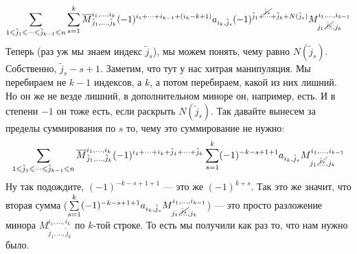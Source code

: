 \documentclass{article}
\begin{document}
\begin{itemize}
\begin{Proof}
            $$
            \sum\limits_{1\leqslant\tilde j_1\leqslant\cdots\leqslant\tilde j_{k-1}\leqslant n}\sum_{s=1}^k
            \overline M_{\tilde j_1,\ldots,\tilde j_k}^{i_1,\ldots,i_k}(-1)^{i_1+\cdots+i_{k-1}+(i_k-k+1)}a_{i_k,\tilde j_s}(-1)^{\tilde j_1+\overset{\cancel{\tilde j_s}}\cdots+\tilde j_k+N(\tilde j_s)}M_{j_1,\overset{\cancel{\tilde j_s}}\ldots,j_k}^{i_1,\ldots,i_{k-1}}
            $$
            Теперь (раз уж мы знаем индекс $\tilde j_s$), мы можем понять, чему равно $N(\tilde j_s)$. Собственно, $\tilde j_s-s+1$. Заметим, что тут у нас хитрая манипуляция. Мы перебираем не $k-1$ индексов, а $k$, а потом перебираем, какой из них лишний. Но он же не везде лишний, в дополнительном миноре он, например, есть. И в степени $-1$ он тоже есть, если раскрыть $N(\tilde j_s)$. Так давайте вынесем за пределы суммирования по $s$ то, чему это суммирование не нужно:
            $$
            \sum\limits_{1\leqslant\tilde j_1\leqslant\cdots\leqslant\tilde j_{k-1}\leqslant n}\overline M_{\tilde j_1,\ldots,\tilde j_k}^{i_1,\ldots,i_k}(-1)^{i_1+\cdots+i_k+\tilde j_1+\cdots+\tilde j_k}\sum_{s=1}^k(-1)^{-k-s+1+1}a_{i_k,\tilde j_s}M_{j_1,\overset{\cancel{\tilde j_s}}\ldots,j_k}^{i_1,\ldots,i_{k-1}}
            $$
            Ну так подождите, $(-1)^{-k-s+1+1}$ --- это же $(-1)^{k+s}$. Так это же значит, что вторая сумма ($\sum\limits_{s=1}^k(-1)^{-k-s+1+1}a_{i_k,\tilde j_s}M_{j_1,\overset{\cancel{\tilde j_s}}\ldots,j_k}^{i_1,\ldots,i_{k-1}}$) --- это просто разложение минора $M_{\tilde j_1,\ldots,\tilde j_k}^{i_1,\ldots,i_k}$ по $k$-той строке. То есть мы получили как раз то, что нам нужно было.
        \end{Proof}
    \end{itemize}
\end{document}

